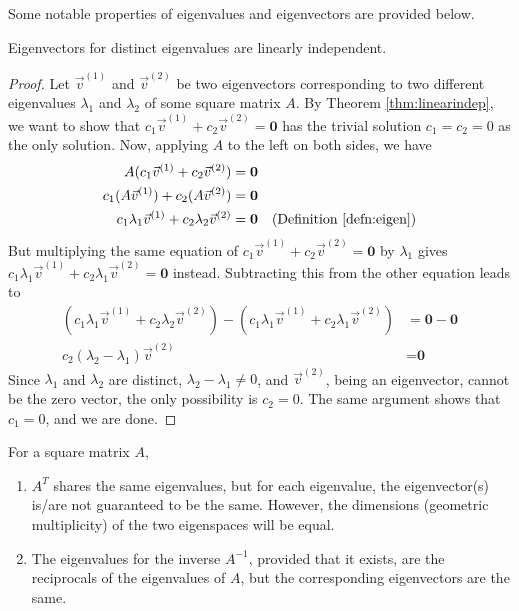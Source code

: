 Some notable properties of eigenvalues and eigenvectors are provided below.
\begin{proper}
\label{proper:eigenlinind}
Eigenvectors for distinct eigenvalues are linearly independent.
\end{proper}
\begin{proof}
Let $\vec{v}^{(1)}$ and $\vec{v}^{(2)}$ be two eigenvectors corresponding to two different eigenvalues $\lambda_1$ and $\lambda_2$ of some square matrix $A$. By Theorem \ref{thm:linearindep}, we want to show that $c_1\vec{v}^{(1)} + c_2\vec{v}^{(2)} = \textbf{0}$ has the trivial solution $c_1 = c_2 = 0$ as the only solution. Now, applying $A$ to the left on both sides, we have
\begin{align*}
A(c_1\vec{v}^{(1)} + c_2\vec{v}^{(2)}) &= \textbf{0} \\
c_1(A\vec{v}^{(1)}) + c_2(A\vec{v}^{(2)}) &= \textbf{0} \\
c_1\lambda_1\vec{v}^{(1)} + c_2\lambda_2\vec{v}^{(2)} &= \textbf{0} & \text{(Definition \ref{defn:eigen})}
\end{align*}
But multiplying the same equation of $c_1\vec{v}^{(1)} + c_2\vec{v}^{(2)} = \textbf{0}$ by $\lambda_1$ gives $c_1\lambda_1\vec{v}^{(1)} + c_2\lambda_1\vec{v}^{(2)} = \textbf{0}$ instead. Subtracting this from the other equation leads to
\begin{align*}
(c_1\lambda_1\vec{v}^{(1)} + c_2\lambda_2\vec{v}^{(2)}) - (c_1\lambda_1\vec{v}^{(1)} + c_2\lambda_1\vec{v}^{(2)}) &= \textbf{0} - \textbf{0} \\
c_2(\lambda_2-\lambda_1)\vec{v}^{(2)} &= \textbf{0}
\end{align*}
Since $\lambda_1$ and $\lambda_2$ are distinct, $\lambda_2-\lambda_1 \neq 0$, and $\vec{v}^{(2)}$, being an eigenvector, cannot be the zero vector, the only possibility is $c_2 = 0$. The same argument shows that $c_1 = 0$, and we are done.
\end{proof}
\begin{proper}
\label{proper:eigentransinv}
For a square matrix $A$,
\begin{enumerate}
\item $A^T$ shares the same eigenvalues, but for each eigenvalue, the eigenvector(s) is/are not guaranteed to be the same. However, the dimensions (geometric multiplicity) of the two eigenspaces will be equal.
\item The eigenvalues for the inverse $A^{-1}$, provided that it exists, are the reciprocals of the eigenvalues of $A$, but the corresponding eigenvectors are the same.
\end{enumerate}
\end{proper}
